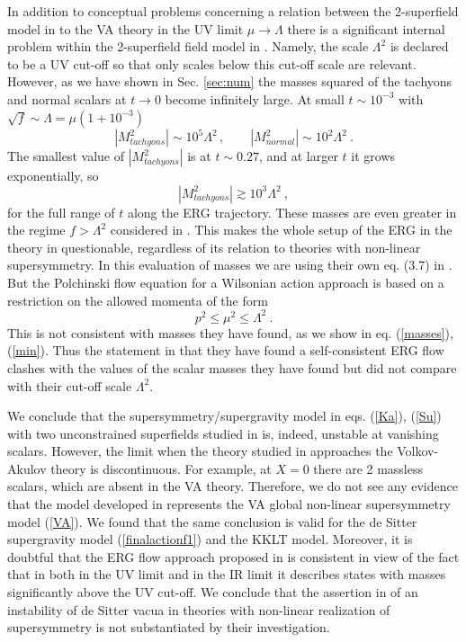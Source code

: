 \documentclass[11pt]{article}
\newcommand{\be}{\begin{equation}}
\newcommand{\ee}{\end{equation}}
\newcommand{\rf}[1]{(\ref{#1})}
\def\be{\begin{equation}}
\def\ee{\end{equation}}
\begin{document}
In addition to conceptual problems concerning a  relation between  the 2-superfield  model in \cite{DallAgata:2022abm} to the VA theory in the UV limit $\mu \to \Lambda$ there is a significant internal problem within the 2-superfield field model in \cite{DallAgata:2022abm}. Namely, the scale $\Lambda^2$ is declared to be a UV cut-off so that only scales below this cut-off scale are relevant. However, as we have shown in Sec. \ref{sec:num} the masses squared of the tachyons and normal scalars at $t \to 0$ become infinitely large. At small $t\sim 10^{-3}$ with  $\sqrt f  \sim \Lambda = \mu (1+10^{-3})$ 
\be
|M^2_{tachyons} | \sim 10^5 \Lambda^2\, ,  \qquad |M^2_{normal} | \sim 10^2 \Lambda^2 \ .
\label{masses}\ee
The smallest value of $|M^2_{tachyons} |$  is at $t\sim 0.27$, and at larger $t$ it grows exponentially, so  
\be
|M^2_{tachyons} | \gtrsim 10^3 \Lambda^2 \ ,
\label{min}\ee
for the full range of $t$ along the ERG trajectory. These masses are even greater in the regime $f > \Lambda^2$ considered in \cite{DallAgata:2022abm}.
This makes the whole setup of the ERG in the theory in \cite{DallAgata:2022abm} questionable, regardless of its relation  to theories with non-linear supersymmetry.   In this evaluation of masses we are using their own eq. (3.7)  in \cite{DallAgata:2022abm}. But the Polchinski flow equation \cite{Polchinski:1983gv,Litim:2018pxe} 
 for a Wilsonian action approach  is based on a restriction on the allowed momenta of the form
\be
p^2 \leq \mu^2 \leq \Lambda ^2 \ .
\ee
This is not consistent with masses they have found,  as we show in eq. \rf{masses}, \rf{min}. Thus the statement in  \cite{DallAgata:2022abm} that they have found a self-consistent ERG flow clashes with the values of the scalar masses they have found but did not compare with their cut-off scale $\Lambda^2$. 
 
We conclude that the supersymmetry/supergravity model in eqs. \rf{Ka}, \rf{Su} with two unconstrained superfields  studied in \cite{DallAgata:2022abm} is, indeed, unstable at vanishing scalars. However, the  limit when the theory studied in  \cite{DallAgata:2022abm} approaches the Volkov-Akulov theory is discontinuous. For example, at $X=0$ there are 2 massless scalars, which are absent in the VA theory. Therefore, we do not see any evidence that  the  model developed in \cite{DallAgata:2022abm}   represents the VA global non-linear supersymmetry model \rf{VA}. We found that the same conclusion is valid for the 
de Sitter supergravity model \rf{finalactionf1} and the KKLT model. Moreover, it is doubtful that the ERG flow approach \cite{Polchinski:1983gv,Litim:2018pxe}  proposed in  \cite{DallAgata:2022abm} is consistent in view of the fact that in both in the UV limit and in the IR limit it describes  states with masses significantly above the UV cut-off. We conclude that
 the assertion in \cite{DallAgata:2022abm} of an instability of de Sitter vacua in  theories with non-linear realization of supersymmetry is not substantiated by their investigation.
\end{document}
